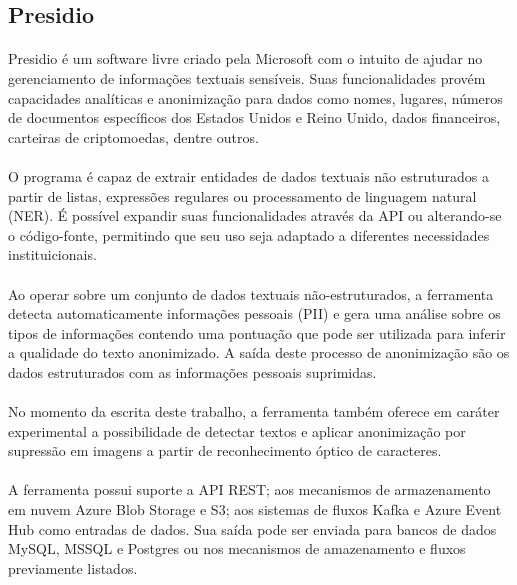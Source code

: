 \subsection{Presidio}

\paragraph{} Presidio é um software livre criado pela Microsoft\cite{presidio} com o intuito de ajudar no gerenciamento de informações textuais sensíveis.
Suas funcionalidades provém capacidades analíticas e anonimização para dados como nomes, lugares, números de documentos específicos dos Estados Unidos e Reino Unido,
dados financeiros, carteiras de criptomoedas, dentre outros.

\paragraph{} O programa é capaz de extrair entidades de dados textuais não estruturados a partir de listas, expressões regulares ou processamento de linguagem natural (NER).
É possível expandir suas funcionalidades através da API ou alterando-se o código-fonte, permitindo que seu uso seja adaptado a diferentes necessidades instituicionais.

\paragraph{} Ao operar sobre um conjunto de dados textuais não-estruturados, a ferramenta detecta automaticamente informações pessoais (PII) e gera uma análise sobre os tipos de informações
contendo uma pontuação que pode ser utilizada para inferir a qualidade do texto anonimizado. A saída deste processo de anonimização são os dados estruturados com as informações pessoais suprimidas.

\paragraph{} No momento da escrita deste trabalho, a ferramenta também oferece em caráter experimental a possibilidade de detectar textos e aplicar anonimização por supressão em imagens a partir de reconhecimento óptico de caracteres.

\paragraph{} A ferramenta possui suporte a API REST; aos mecanismos de armazenamento em nuvem Azure Blob Storage e S3; aos sistemas de fluxos Kafka e Azure Event Hub como entradas de dados.
Sua saída pode ser enviada para bancos de dados MySQL, MSSQL e Postgres ou nos mecanismos de amazenamento e fluxos previamente listados.

